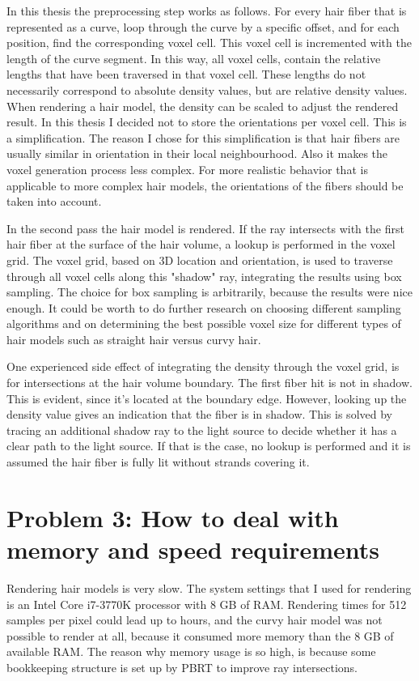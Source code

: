\documentclass[11pt,a4paper]{report}
\begin{document}
In this thesis the preprocessing step works as follows. For every hair fiber that is represented as a curve, loop through the curve by a specific offset, and for each position, find the corresponding voxel cell. This voxel cell is incremented with the length of the curve segment. In this way, all voxel cells, contain the relative lengths that have been traversed in that voxel cell. These lengths do not necessarily correspond to absolute density values, but are relative density values. When rendering a hair model, the density can be scaled to adjust the rendered result. In this thesis I decided not to store the orientations per voxel cell. This is a simplification. The reason I chose for this simplification is that hair fibers are usually similar in orientation in their local neighbourhood. Also it makes the voxel generation process less complex. For more realistic behavior that is applicable to more complex hair models, the orientations of the fibers should be taken into account.

In the second pass the hair model is rendered. If the ray intersects with the first hair fiber at the surface of the hair volume, a lookup is performed in the voxel grid. The voxel grid, based on 3D location and orientation, is used to traverse through all voxel cells along this "shadow" ray, integrating the results using box sampling. The choice for box sampling is arbitrarily, because the results were nice enough. It could be worth to do further research on choosing different sampling algorithms and on determining the best possible voxel size for different types of hair models such as straight hair versus curvy hair.

One experienced side effect of integrating the density through the voxel grid, is for intersections at the hair volume boundary. The first fiber hit is not in shadow. This is evident, since it's located at the boundary edge. However, looking up the density value gives an indication that the fiber is in shadow. This is solved by tracing an additional shadow ray to the light source to decide whether it has a clear path to the light source. If that is the case, no lookup is performed and it is assumed the hair fiber is fully lit without strands covering it.

\section{Problem 3: How to deal with memory and speed requirements}

Rendering hair models is very slow. The system settings that I used for rendering is an Intel Core i7-3770K processor with 8 GB of RAM. Rendering times for 512 samples per pixel could lead up to hours, and the curvy hair model was not possible to render at all, because it consumed more memory than the 8 GB of available RAM. The reason why memory usage is so high, is because some bookkeeping structure is set up by PBRT to improve ray intersections.
\end{document}
